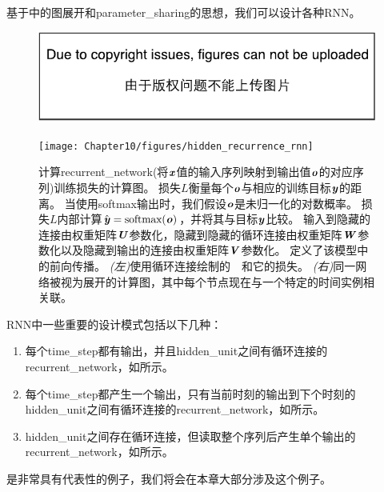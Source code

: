 \section{}
\label{sec:recurrent_neural_networks}
基于中的图展开和\gls{parameter_sharing}的思想，我们可以设计各种\gls{RNN}。
\begin{figure}[!htb]
\ifOpenSource
\centerline{\includegraphics{figure.pdf}}
\else
\centerline{\texttt{[image: Chapter10/figures/hidden\_recurrence\_rnn]}}
\fi
\caption{计算\gls{recurrent_network}(将$\boldsymbol{\mathit{x}}$值的输入序列映射到输出值$\boldsymbol{\mathit{o}}$的对应序列)训练损失的计算图。
损失$L$衡量每个$\boldsymbol{\mathit{o}}$与相应的训练目标$\boldsymbol{\mathit{y}}$的距离。
当使用softmax输出时，我们假设$\boldsymbol{\mathit{o}}$是未归一化的对数概率。
损失$L$内部计算$\hat{\boldsymbol{\mathit{y}}} = \text{softmax}(\boldsymbol{\mathit{o}})$，并将其与目标$\boldsymbol{\mathit{y}}$比较。
输入到隐藏的连接由权重矩阵$\boldsymbol{\mathit{U}}$参数化，隐藏到隐藏的循环连接由权重矩阵$\boldsymbol{\mathit{W}}$参数化以及隐藏到输出的连接由权重矩阵$\boldsymbol{\mathit{V}}$参数化。
定义了该模型中的前向传播。
\emph{(左)}使用循环连接绘制的~~和它的损失。
\emph{(右)}同一网络被视为展开的计算图，其中每个节点现在与一个特定的时间实例相关联。
}
\label{fig:chap10_hidden_recurrence_rnn}
\end{figure}

\gls{RNN}中一些重要的设计模式包括以下几种：
\begin{enumerate}
 \item 每个\gls{time_step}都有输出，并且\gls{hidden_unit}之间有循环连接的\gls{recurrent_network}，如所示。
 \item 每个\gls{time_step}都产生一个输出，只有当前时刻的输出到下个时刻的\gls{hidden_unit}之间有循环连接的\gls{recurrent_network}，如所示。
 \item \gls{hidden_unit}之间存在循环连接，但读取整个序列后产生单个输出的\gls{recurrent_network}，如所示。
\end{enumerate}
是非常具有代表性的例子，我们将会在本章大部分涉及这个例子。

